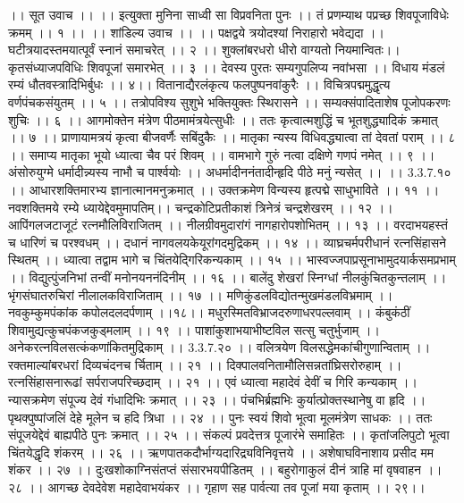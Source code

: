 ।। सूत उवाच ।। ।।
इत्युक्ता मुनिना साध्वी सा विप्रवनिता पुनः ।।
तं प्रणम्याथ पप्रच्छ शिवपूजाविधेः क्रमम् ।। १ ।।
।। शांडिल्य उवाच ।। ।।
पक्षद्वये त्रयोदश्यां निराहारो भवेद्यदा ।।
घटीत्रयादस्तमयात्पूर्वं स्नानं समाचरेत् ।। २ ।।
शुक्लांबरधरो धीरो वाग्यतो नियमान्वितः।।
कृतसंध्याजपविधिः शिवपूजां समारभेत् ।। ३ ।।
देवस्य पुरतः सम्यगुपलिप्य नवांभसा ।।
विधाय मंडलं रम्यं धौतवस्त्रादिभिर्बुधः ।। ४।।
वितानाद्यैरलंकृत्य फलपुष्पनवांकुरैः ।।
विचित्रपद्ममुद्धृत्य वर्णपंचकसंयुतम् ।। ५ ।।
तत्रोपविश्य सुशुभे भक्तियुक्तः स्थिरासने ।।
सम्यक्संपादिताशेष पूजोपकरणः शुचिः ।। ६ ।।
आगमोक्तेन मंत्रेण पीठमामंत्रयेत्सुधीः ।।
ततः कृत्वात्मशुद्धिं च भूतशुद्ध्यादिकं क्रमात् ।। ७ ।।
प्राणायामत्रयं कृत्वा बीजवर्णैः सबिंदुकैः ।।
मातृका न्यस्य विधिवद्ध्यात्वा तां देवतां पराम् ।। ८ ।।
समाप्य मातृका भूयो ध्यात्वा चैव परं शिवम् ।।
वामभागे गुरुं नत्वा दक्षिणे गणपं नमेत् ।। ९ ।।
अंसोरुयुग्मे धर्मादीन्न्यस्य नाभौ च पार्श्वयोः ।।
अधर्मादीननंतादीन्हृदि पीठे मनुं न्यसेत् ।। ।। 3.3.7.१० ।।
आधारशक्तिमारभ्य ज्ञानात्मानमनुक्रमात् ।।
उक्तक्रमेण विन्यस्य हृत्पद्मे साधुभाविते ।। ११ ।।
नवशक्तिमये रम्ये ध्यायेद्देवमुमापतिम्।।
चन्द्रकोटिप्रतीकाशं त्रिनेत्रं चन्द्रशेखरम् ।। १२ ।।
आपिंगलजटाजूटं रत्नमौलिविराजितम् ।।
नीलग्रीवमुदारांगं नागहारोपशोभितम् ।। १३ ।।
वरदाभयहस्तं च धारिणं च परश्वधम् ।।
दधानं नागवलयकेयूरांगदमुद्रिकम् ।। १४ ।।
व्याघ्रचर्मपरीधानं रत्नसिंहासने स्थितम् ।।
ध्यात्वा तद्वाम भागे च चिंतयेद्गिरिकन्यकाम् ।। १५ ।।
भास्वज्जपाप्रसूनाभामुदयार्कसमप्रभाम् ।।
विद्युत्पुंजनिभां तन्वीं मनोनयननंदिनीम् ।। १६ ।।
बालेंदु शेखरां स्निग्धां नीलकुंचितकुन्तलाम् ।।
भृंगसंघातरुचिरां नीलालकविराजिताम् ।। १७ ।।
मणिकुंडलविद्योतन्मुखमंडलविभ्रमाम् ।।
नवकुम्कुमपंकांक कपोलदलदर्पणाम् ।।१८।।
मधुरस्मितविभ्राजदरुणाधरपल्लवाम् ।।
कंबुकंठीं शिवामुद्यत्कुचपंकजकुड्मलाम् ।। १९ ।।
पाशांकुशाभयाभीष्टविल सत्सु चतुर्भुजाम् ।।
अनेकरत्नविलसत्कंकणांकितमुद्रिकाम् ।। 3.3.7.२० ।।
वलित्रयेण विलसद्धेमकांचीगुणान्विताम् ।।
रक्तमाल्यांबरधरां दिव्यचंदनच र्चिताम् ।। २१ ।।
दिक्पालवनितामौलिसन्नतांघ्रिसरोरुहाम् ।।
रत्नसिंहासनारूढां सर्पराजपरिच्छदाम् ।। २१ ।।
एवं ध्यात्वा महादेवं देवीं च गिरि कन्यकाम् ।।
न्यासक्रमेण संपूज्य देवं गंधादिभिः क्रमात् ।। २३ ।।
पंचभिर्ब्रह्मभिः कुर्यात्प्रोक्तस्थानेषु वा हृदि ।।
पृथक्पुष्पांजलिं देहे मूलेन च हदि त्रिधा ।। २४ ।।
पुनः स्वयं शिवो भूत्वा मूलमंत्रेण साधकः ।।
ततः संपूजयेद्देवं बाह्यपीठे पुनः क्रमात् ।। २५ ।।
संकल्पं प्रवदेत्तत्र पूजारंभे समाहितः ।।
कृतांजलिपुटो भूत्वा चिंतयेद्धृदि शंकरम् ।। २६ ।।
ऋणपातकदौर्भाग्यदारिद्र्यविनिवृत्तये ।।
अशेषाघविनाशाय प्रसीद मम शंकर ।। २७ ।।
दुःखशोकाग्निसंतप्तं संसारभयपीडितम् ।।
बहुरोगाकुलं दीनं त्राहि मां वृषवाहन ।। २८ ।।
आगच्छ देवदेवेश महादेवाभयंकर ।।
गृहाण सह पार्वत्या तव पूजां मया कृताम् ।। २९।।
